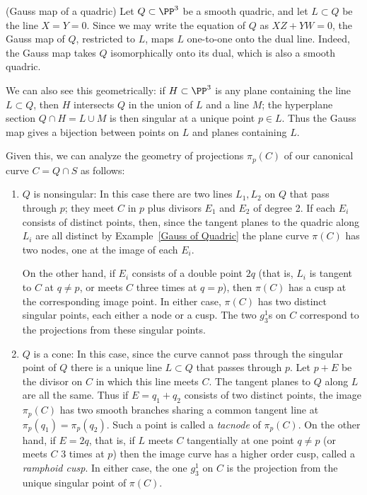\begin{example} (Gauss map of a quadric)\label{Gauss of Quadric}
 Let $Q\subset \PP^3$ be a smooth quadric, and let $L\subset Q$ be the line $X=Y =0$. Since we may write the equation of $Q$ as $XZ+YW = 0$, the Gauss map of $Q$, restricted to $L$, maps $L$ one-to-one onto the dual line. Indeed, the Gauss map takes $Q$ isomorphically onto its dual, which is also a smooth quadric.
 
 We can also see this geometrically: if $H \subset \PP^3$ is any plane containing the line $L \subset Q$, then $H$ intersects $Q$ in the union of $L$ and a line $M$; the hyperplane section $Q \cap H = L \cup M$ is then singular at a unique point $p \in L$. Thus the Gauss map gives a bijection between points on $L$ and planes containing $L$. 
\end{example}

Given this, we can analyze the geometry of projections $\pi_p(C)$ of our canonical curve $C = Q \cap S$ as follows:

\begin{enumerate}
\item $Q$ is nonsingular:
In this case there are two lines $L_1, L_2$ on $Q$ that pass through $p$; they meet $C$ in $p$ plus divisors $E_1$ and $E_2$ of degree 2. If each $E_i$ consists of distinct points, then, since the tangent planes to the quadric along $L_i$ are all distinct by Example~\ref{Gauss of Quadric} the plane curve $\pi(C)$ has two nodes, one at the image of each $E_i$.

On the other hand, if $E_i$ consists of a double point $2q$ (that is, $L_i$ is tangent to $C$ at $q\neq p$, or meets $C$ three times at $q = p$), then $\pi(C)$ has a cusp at the corresponding image point. 
In either case, $\pi(C)$ has two distinct singular points, each either a node or a cusp. The two $g^1_3$s on $C$ correspond to the projections from these singular points.


\item $Q$ is a cone:
In this case, since the curve cannot pass through the singular point of $Q$ there is a unique line $L\subset Q$ that passes through $p$. Let $p+E$ be the divisor on $C$ in which this line meets $C$. The tangent planes to $Q$ along $L$ are all the same. Thus if $E = q_1+q_2$ consists of two distinct points, the image $\pi_p(C)$ has two smooth branches sharing a common tangent line at
$\pi_p(q_1) = \pi_p(q_2)$. Such a point is called a \emph{tacnode} of $\pi_p(C)$. On the other hand, if $E= 2q$, that is, if $L$ meets $C$ tangentially at one point $q\neq p$ (or meets $C$ 3 times at $p$) then the image curve has a higher order cusp, called a \emph{ramphoid cusp}. In either case, the one $g^1_3$ on $C$ is the projection from the unique singular point of $\pi(C)$.

\end{enumerate}

